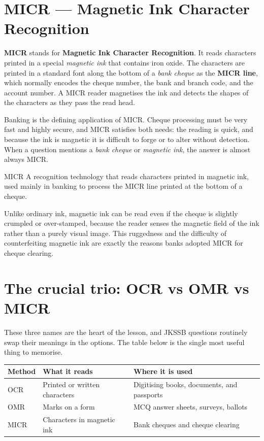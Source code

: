 \section{MICR --- Magnetic Ink Character Recognition}
\textbf{MICR} stands for \textbf{Magnetic Ink Character Recognition}. It
reads characters printed in a special \emph{magnetic ink} that contains iron
oxide. The characters are printed in a standard font along the bottom of a
\emph{bank cheque} as the \textbf{MICR line}, which normally encodes the
cheque number, the bank and branch code, and the account number. A MICR
reader magnetises the ink and detects the shapes of the characters as they
pass the read head.

Banking is the defining application of MICR. Cheque processing must be very
fast and highly secure, and MICR satisfies both needs: the reading is quick,
and because the ink is magnetic it is difficult to forge or to alter without
detection. When a question mentions a \emph{bank cheque} or \emph{magnetic
ink}, the answer is almost always MICR.

\begin{definitionbox}{MICR}
A recognition technology that reads characters printed in magnetic ink,
used mainly in banking to process the MICR line printed at the bottom of a
cheque.
\end{definitionbox}

Unlike ordinary ink, magnetic ink can be read even if the cheque is slightly
crumpled or over-stamped, because the reader senses the magnetic field of
the ink rather than a purely visual image. This ruggedness and the difficulty
of counterfeiting magnetic ink are exactly the reasons banks adopted MICR
for cheque clearing.

\section{The crucial trio: OCR vs OMR vs MICR}
These three names are the heart of the lesson, and JKSSB questions routinely
swap their meanings in the options. The table below is the single most useful
thing to memorise.

\begin{center}
\begin{tabular}{p{}p{}p{}}
\toprule
\textbf{Method} & \textbf{What it reads} & \textbf{Where it is used} \\
\midrule
OCR & Printed or written characters & Digitising books, documents, and passports \\
OMR & Marks on a form & MCQ answer sheets, surveys, ballots \\
MICR & Characters in magnetic ink & Bank cheques and cheque clearing \\
\bottomrule
\end{tabular}
\end{center}

